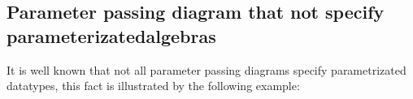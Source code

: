 \begin{example}




\end{example}
 

\subsection{Parameter passing diagram that not specify parameterizatedalgebras}
It is well known that not all parameter passing diagrams specify parametrizated datatypes, this fact is illustrated by the following example:

